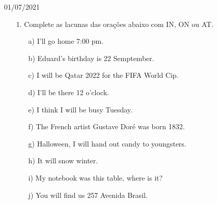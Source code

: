 \documentclass{SchoolBook}
\begin{document}
    \begin{day}{01/07/2021}
        \begin{enumerate}
            \item[1.] Complete as lacunas das orações abaixo com IN, ON ou AT.
            \begin{enumerate}
                \item[a)] I'll go home  7:00 pm.
                \item[b)] Eduard's birthday is  22 Semptember.
                \item[c)] I will be  Qatar  2022 for the FIFA World Cip.
                \item[d)] I'll be there  12 o'clock.
                \item[e)] I think I will be busy  Tuesday.
                \item[f)] The French artist Gustave Doré was born  1832.
                \item[g)]  Halloween, I will hand out candy to youngsters.
                \item[h)] It will snow  winter.
                \item[i)] My notebook was  this table, where is it?
                \item[j)] You will find us  257 Avenida Brasil.
            \end{enumerate}
        \end{enumerate}
    \end{day}
\end{document}
